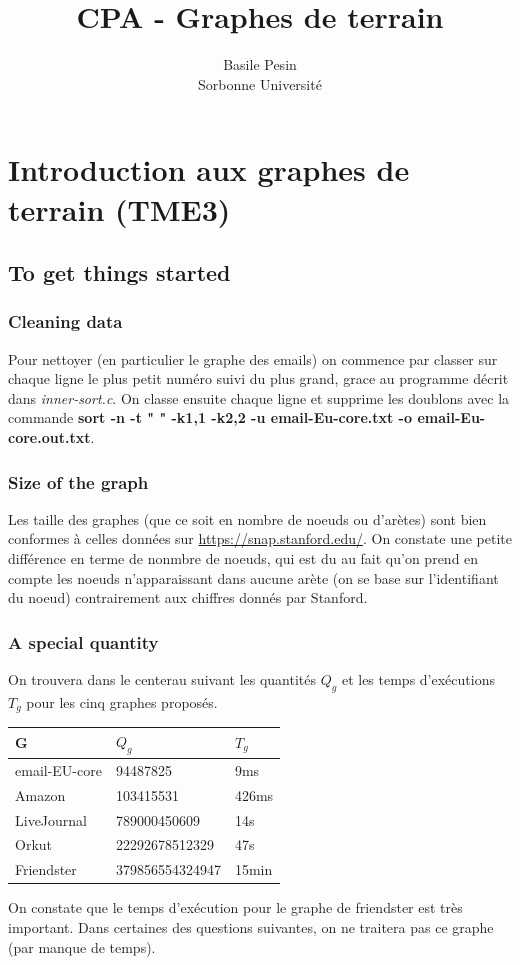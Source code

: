 \documentclass{report}
\title{CPA - Graphes de terrain}
\author{Basile Pesin\\Sorbonne Université}
\begin{document}
\maketitle

\chapter{Introduction aux graphes de terrain (TME3)}

\section{To get things started}

\subsection*{Cleaning data}
Pour nettoyer (en particulier le graphe des emails) on commence par classer sur chaque ligne le plus petit numéro suivi du plus grand, grace au programme décrit dans \textit{inner-sort.c}. On classe ensuite chaque ligne et supprime les doublons avec la commande \textbf{sort -n -t " " -k1,1 -k2,2 -u email-Eu-core.txt -o email-Eu-core.out.txt}.

\subsection*{Size of the graph}
Les taille des graphes (que ce soit en nombre de noeuds ou d'arètes) sont bien conformes à celles données sur \url{https://snap.stanford.edu/}. On constate une petite différence en terme de nonmbre de noeuds, qui est du au fait qu'on prend en compte les noeuds n'apparaissant dans aucune arète (on se base sur l'identifiant du noeud) contrairement aux chiffres donnés par Stanford.

\subsection*{A special quantity}
On trouvera dans le centerau suivant les quantités $Q_g$ et les temps d'exécutions $T_g$ pour les cinq graphes proposés.

\begin{center}
  \begin{tabular}{|l|l|l|}
    \hline
    G & $Q_g$ & $T_g$ \\
    \hline
    email-EU-core & 94487825 & 9ms\\
    Amazon & 103415531 & 426ms \\
    LiveJournal & 789000450609 & 14s \\
    Orkut & 22292678512329 & 47s \\
    Friendster & 379856554324947 & 15min \\
    \hline
  \end{tabular}
\end{center}
On constate que le temps d'exécution pour le graphe de friendster est très important. Dans certaines des questions suivantes, on ne traitera pas ce graphe (par manque de temps).
\end{document}
